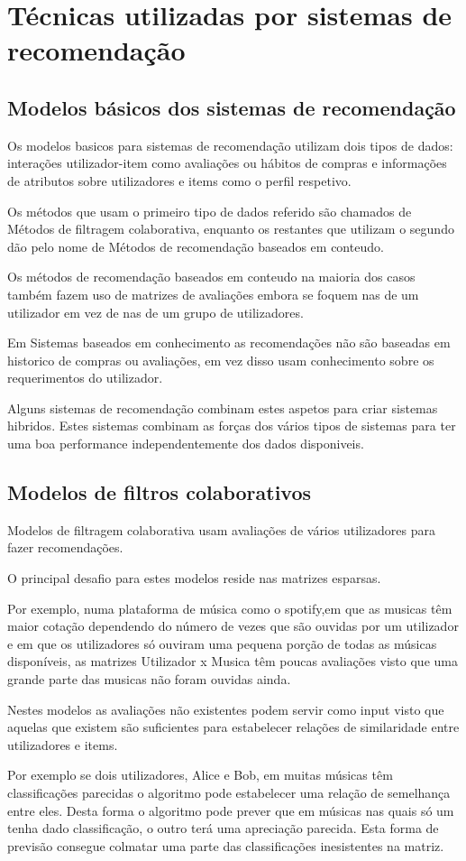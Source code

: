 \section{Técnicas utilizadas por sistemas de recomendação}
\hfill
\subsection{Modelos básicos dos sistemas de recomendação}
\hfill
\par Os modelos basicos para sistemas de recomendação utilizam dois tipos de dados: interações utilizador-item como avaliações ou hábitos de compras e informações de atributos sobre utilizadores e items como o perfil respetivo.
\par Os métodos que usam o primeiro tipo de dados referido são chamados de Métodos de filtragem colaborativa, enquanto os restantes que utilizam o segundo dão pelo nome de Métodos de recomendação baseados em conteudo.
\par Os métodos de recomendação baseados em conteudo na maioria dos casos também fazem uso de matrizes de avaliações embora se foquem nas de um utilizador em vez de nas de um grupo de utilizadores.
\par Em Sistemas baseados em conhecimento as recomendações não são baseadas em historico de compras ou avaliações, em vez disso usam conhecimento sobre os requerimentos do utilizador.
\par Alguns sistemas de recomendação combinam estes aspetos para criar sistemas hibridos. Estes sistemas combinam as forças dos vários tipos de sistemas para ter uma boa performance independentemente dos dados disponiveis.
\hfill
\subsection{Modelos de filtros colaborativos}
\hfill
\par Modelos de filtragem colaborativa usam avaliações de vários utilizadores para fazer recomendações.
\par O principal desafio para estes modelos reside nas matrizes esparsas.
\par Por exemplo, numa plataforma de música como o spotify,em que as musicas têm maior cotação dependendo do número de vezes que são ouvidas por um utilizador e em que os utilizadores só ouviram uma pequena porção de todas as músicas disponíveis, as matrizes Utilizador x Musica têm poucas avaliações visto que uma grande parte das musicas não foram ouvidas ainda.
\par Nestes modelos as avaliações não existentes podem servir como input visto que aquelas que existem são suficientes para estabelecer relações de similaridade entre utilizadores e items.
\par Por exemplo se dois utilizadores, Alice e Bob, em muitas músicas têm classificações parecidas o algoritmo pode estabelecer uma relação de semelhança entre eles. Desta forma o algoritmo pode prever que em músicas nas quais só um tenha dado classificação, o outro terá uma apreciação parecida. Esta forma de previsão consegue colmatar uma parte das classificações inesistentes na matriz.

